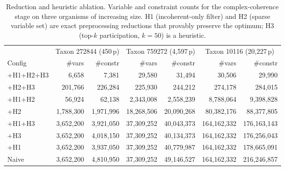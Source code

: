 \begin{table}[!h]
\centering
\caption{Reduction and heuristic ablation. Variable and constraint counts for the complex-coherence stage on three organisms of increasing size. H1 (incoherent-only filter) and H2 (sparse variable set) are exact preprocessing reductions that provably preserve the optimum; H3 (top-$k$ participation, $k=50$) is a heuristic.}
\label{tab:ablation-dry-run}
\small
\setlength{\tabcolsep}{4pt}
\begin{tabular}{l*{6}{r}}
\toprule
 & \multicolumn{2}{c}{Taxon 272844 (450\,p)} & \multicolumn{2}{c}{Taxon 759272 (4{,}597\,p)} & \multicolumn{2}{c}{Taxon 10116 (20{,}227\,p)} \\
\cmidrule(lr){2-3}\cmidrule(lr){4-5}\cmidrule(lr){6-7}
Config & \#vars & \#constr & \#vars & \#constr & \#vars & \#constr \\
\midrule
+H1+H2+H3 &     6{,}658 &     7{,}381 &    29{,}580 &    31{,}494 &    30{,}506 &    29{,}990 \\
+H2+H3    &   201{,}766 &   226{,}284 &   225{,}930 &   244{,}212 &   274{,}178 &   284{,}015 \\
+H1+H2    &    56{,}924 &    62{,}138 & 2{,}343{,}008 & 2{,}558{,}239 & 8{,}788{,}064 & 9{,}398{,}828 \\
+H2       & 1{,}788{,}300 & 1{,}971{,}996 & 18{,}268{,}506 & 20{,}090{,}268 & 80{,}382{,}176 & 88{,}377{,}805 \\
+H1+H3    & 3{,}652{,}200 & 3{,}921{,}050 & 37{,}309{,}252 & 40{,}043{,}373 & 164{,}162{,}332 & 176{,}163{,}143 \\
+H3       & 3{,}652{,}200 & 4{,}018{,}150 & 37{,}309{,}252 & 40{,}134{,}373 & 164{,}162{,}332 & 176{,}256{,}043 \\
+H1       & 3{,}652{,}200 & 3{,}937{,}050 & 37{,}309{,}252 & 40{,}779{,}987 & 164{,}162{,}332 & 178{,}665{,}091 \\
Naive     & 3{,}652{,}200 & 4{,}810{,}950 & 37{,}309{,}252 & 49{,}146{,}527 & 164{,}162{,}332 & 216{,}246{,}857 \\
\bottomrule
\end{tabular}
\end{table}
